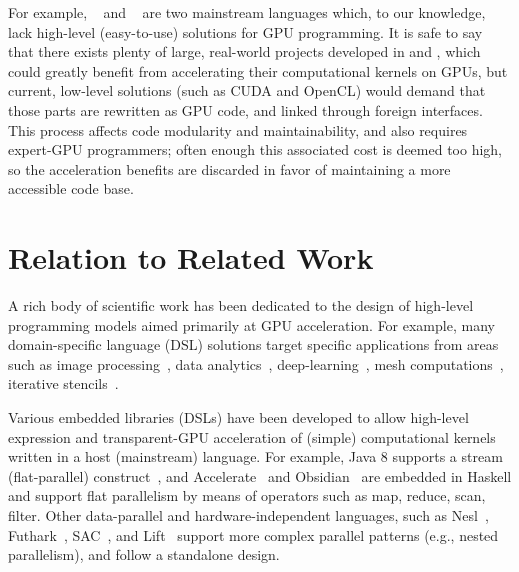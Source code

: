 %
For example, \csharp{}~\cite{Hejlsberg} and \fsharp{}~\cite{Fsharp-Hansen} are two mainstream 
languages which, to our knowledge, lack high-level (easy-to-use) solutions 
for GPU programming. 
%
It is safe to say that there exists plenty of large, real-world projects
developed in \csharp{} and \fsharp{}, which could greatly benefit from 
accelerating their computational kernels on GPUs, but current, low-level
solutions (such as CUDA and OpenCL) would demand that those parts are 
rewritten as GPU code, and linked through foreign interfaces. 
This process affects code modularity and maintainability, and also requires
expert-GPU programmers; often enough this associated cost is deemed too high,
so the acceleration benefits are discarded in favor of maintaining a more 
accessible code base.

\section{Relation to Related Work}
%
A rich body of scientific work has been dedicated to the design of high-level 
programming models aimed primarily at GPU acceleration.  
%
For example, many domain-specific language (DSL) solutions target specific 
applications from areas such as image processing~\cite{Halide}, data 
analytics~\cite{HPAT}, deep-learning~\cite{DeliteDSLs}, mesh 
computations~\cite{OP2-Mesh}, iterative stencils~\cite{tang2011pochoir}. 

Various embedded libraries (DSLs) have been developed to allow high-level
expression and transparent-GPU acceleration of (simple) computational 
kernels written in a host (mainstream) language. For example, 
Java $8$ supports a stream (flat-parallel) construct~\cite{StreamJava8},
and Accelerate~\cite{Accelerate-DAMP,AccelerateStreaming} and 
Obsidian~\cite{svensson2011obsidian} are embedded in Haskell and support 
flat parallelism by means of operators such as map, reduce, scan, filter.
%
Other data-parallel and hardware-independent languages, such as 
Nesl~\cite{blelloch1994implementation,Bergstrom:2012:NDG:2398856.2364563},
Futhark~\cite{pldi17,Futhark:redomap,Futhark-ICFP18}, 
SAC~\cite{SaCShared2005,GrelSchoIJPP06}, and Lift~\cite{Lift-CGO17,Lift-ICFP}
support more complex parallel patterns (e.g., nested parallelism), 
and follow a standalone design.

